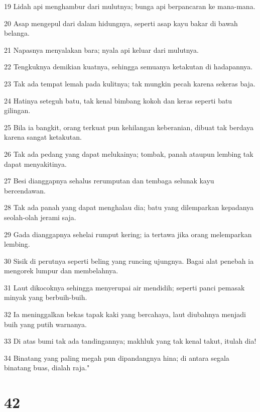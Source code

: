 \par 19 Lidah api menghambur dari mulutnya; bunga api berpancaran ke mana-mana.
\par 20 Asap mengepul dari dalam hidungnya, seperti asap kayu bakar di bawah belanga.
\par 21 Napasnya menyalakan bara; nyala api keluar dari mulutnya.
\par 22 Tengkuknya demikian kuatnya, sehingga semuanya ketakutan di hadapannya.
\par 23 Tak ada tempat lemah pada kulitnya; tak mungkin pecah karena sekeras baja.
\par 24 Hatinya seteguh batu, tak kenal bimbang kokoh dan keras seperti batu gilingan.
\par 25 Bila ia bangkit, orang terkuat pun kehilangan keberanian, dibuat tak berdaya karena sangat ketakutan.
\par 26 Tak ada pedang yang dapat melukainya; tombak, panah ataupun lembing tak dapat menyakitinya.
\par 27 Besi dianggapnya sehalus rerumputan dan tembaga selunak kayu bercendawan.
\par 28 Tak ada panah yang dapat menghalau dia; batu yang dilemparkan kepadanya seolah-olah jerami saja.
\par 29 Gada dianggapnya sehelai rumput kering; ia tertawa jika orang melemparkan lembing.
\par 30 Sisik di perutnya seperti beling yang runcing ujungnya. Bagai alat penebah ia mengorek lumpur dan membelahnya.
\par 31 Laut dikocoknya sehingga menyerupai air mendidih; seperti panci pemasak minyak yang berbuih-buih.
\par 32 Ia meninggalkan bekas tapak kaki yang bercahaya, laut diubahnya menjadi buih yang putih warnanya.
\par 33 Di atas bumi tak ada tandingannya; makhluk yang tak kenal takut, itulah dia!
\par 34 Binatang yang paling megah pun dipandangnya hina; di antara segala binatang buas, dialah raja."

\chapter{42}

